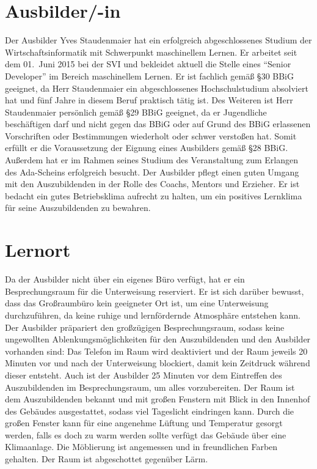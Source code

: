 \section{Ausbilder/-in}
Der Ausbilder Yves Staudenmaier hat ein erfolgreich abgeschlossenes Studium der Wirtschaftsinformatik mit Schwerpunkt maschinellem Lernen. Er arbeitet seit dem 01.~Juni 2015 bei der \ac{SVI} und bekleidet aktuell die Stelle eines \enquote{Senior Developer} im Bereich maschinellem Lernen. Er ist fachlich gemäß §30 BBiG geeignet, da Herr Staudenmaier ein abgeschlossenes Hochschulstudium absolviert hat und fünf Jahre in diesem Beruf praktisch tätig ist. Des Weiteren ist Herr Staudenmaier persönlich gemäß §29 BBiG geeignet, da er Jugendliche beschäftigen darf und nicht gegen das \ac{BBiG} oder auf Grund des \ac{BBiG} erlassenen Vorschriften oder Bestimmungen wiederholt oder schwer verstoßen hat. Somit erfüllt er die Voraussetzung der Eignung eines Ausbilders gemäß §28 BBiG. Außerdem hat er im Rahmen seines Studium des Veranstaltung zum Erlangen des Ada-Scheins erfolgreich besucht. Der Ausbilder pflegt einen guten Umgang mit den Auszubildenden in der Rolle des Coachs, Mentors und Erzieher. Er ist bedacht ein gutes Betriebsklima aufrecht zu halten, um ein positives Lernklima für seine Auszubildenden zu bewahren.

\section{Lernort}
Da der Ausbilder nicht über ein eigenes Büro verfügt, hat er ein Besprechungsraum für die Unterweisung reserviert. Er ist sich darüber bewusst, dass das Großraumbüro kein geeigneter Ort ist, um eine Unterweisung durchzuführen, da keine ruhige und lernfördernde Atmosphäre entstehen kann. Der Ausbilder präpariert den großzügigen Besprechungsraum, sodass keine ungewollten Ablenkungsmöglichkeiten für den Auszubildenden und den Ausbilder vorhanden sind: Das Telefon im Raum wird deaktiviert und der Raum jeweils 20 Minuten vor und nach der Unterweisung blockiert, damit kein Zeitdruck während dieser entsteht. Auch ist der Ausbilder 25 Minuten vor dem Eintreffen des Auszubildenden im Besprechungsraum, um alles vorzubereiten. Der Raum ist dem Auszubildenden bekannt und mit großen Fenstern mit Blick in den Innenhof des Gebäudes ausgestattet, sodass viel Tageslicht eindringen kann. Durch die großen Fenster kann für eine angenehme Lüftung und Temperatur gesorgt werden, falls es doch zu warm werden sollte verfügt das Gebäude über eine Klimaanlage. Die Möblierung ist angemessen und in freundlichen Farben gehalten. Der Raum ist abgeschottet gegenüber Lärm. 

